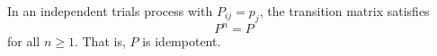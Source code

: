 In an independent trials process with $P_{ij} = p_j$, the transition matrix satisfies
$$P^n = P$$
for all $n \geq 1$. That is, $P$ is idempotent.
